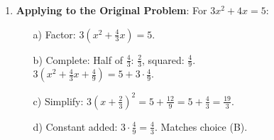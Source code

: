 \documentclass[12pt]{article}
\begin{document}
\begin{enumerate}[label=20.\arabic*]
    \item \textbf{Applying to the Original Problem}: For \( 3x^2 + 4x = 5 \):
    \begin{enumerate}
        \item[a)] Factor: \( 3(x^2 + \frac{4}{3}x) = 5 \).
        \item[b)] Complete: Half of \( \frac{4}{3} \): \( \frac{2}{3} \), squared: \( \frac{4}{9} \). \\
        \( 3\left(x^2 + \frac{4}{3}x + \frac{4}{9}\right) = 5 + 3 \cdot \frac{4}{9} \).
        \item[c)] Simplify: \( 3\left(x + \frac{2}{3}\right)^2 = 5 + \frac{12}{9} = 5 + \frac{4}{3} = \frac{19}{3} \).
        \item[d)] Constant added: \( 3 \cdot \frac{4}{9} = \frac{4}{3} \). Matches choice (B).
    \end{enumerate}
\end{enumerate}

\end{document}
